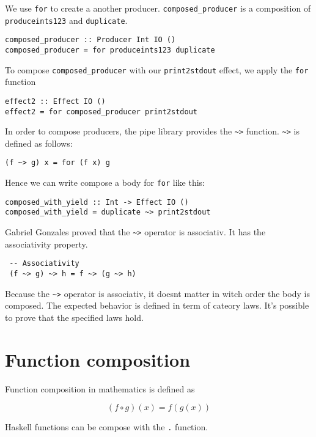 \documentclass[twoside, a4paper]{article}
\begin{document}
We use \verb|for| to create a another producer. \verb|composed_producer| is a composition of \verb|produceints123| and \verb|duplicate|.
\begin{verbatim}
composed_producer :: Producer Int IO ()
composed_producer = for produceints123 duplicate
\end{verbatim}

To compose \verb|composed_producer| with our \verb|print2stdout| effect, we apply the \verb|for| function

\begin{verbatim}
effect2 :: Effect IO ()
effect2 = for composed_producer print2stdout
\end{verbatim}

In order to compose producers, the pipe library provides the \verb|~>| function. \verb|~>| is defined as follows:
\begin{verbatim}
(f ~> g) x = for (f x) g
\end{verbatim}

Hence we can write compose a body for \verb|for| like this:
\begin{verbatim}
composed_with_yield :: Int -> Effect IO ()
composed_with_yield = duplicate ~> print2stdout
\end{verbatim}

Gabriel Gonzales proved that the \verb|~>| operator is associativ. It has the associativity property.

\begin{verbatim}
 -- Associativity
 (f ~> g) ~> h = f ~> (g ~> h)
\end{verbatim}

Because the \verb|~>| operator is associativ, it doesnt matter in witch order the body is composed. The expected behavior is defined in term of cateory laws. It's possible to prove that the specified laws hold.

\section{Function composition}

\label{sec:functioncomposition}

Function composition in mathematics is defined as

\begin{equation}
  \label{eq:functioncomposition}
  (f \circ g)(x) = f(g(x))
\end{equation}

Haskell functions can be compose with the \verb|.| function.
\end{document}
